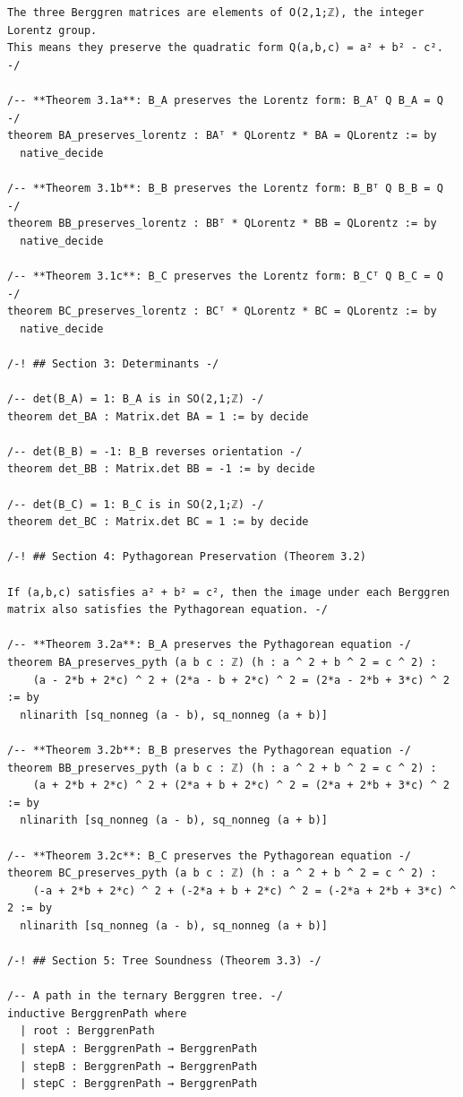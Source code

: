 \documentclass[11pt,openany]{book}
\theoremstyle{definition}
\theoremstyle{plain}
\theoremstyle{remark}
\begin{document}
\begin{lstlisting}[style=lean]
The three Berggren matrices are elements of O(2,1;ℤ), the integer Lorentz group.
This means they preserve the quadratic form Q(a,b,c) = a² + b² - c². -/

/-- **Theorem 3.1a**: B_A preserves the Lorentz form: B_Aᵀ Q B_A = Q -/
theorem BA_preserves_lorentz : BAᵀ * QLorentz * BA = QLorentz := by
  native_decide

/-- **Theorem 3.1b**: B_B preserves the Lorentz form: B_Bᵀ Q B_B = Q -/
theorem BB_preserves_lorentz : BBᵀ * QLorentz * BB = QLorentz := by
  native_decide

/-- **Theorem 3.1c**: B_C preserves the Lorentz form: B_Cᵀ Q B_C = Q -/
theorem BC_preserves_lorentz : BCᵀ * QLorentz * BC = QLorentz := by
  native_decide

/-! ## Section 3: Determinants -/

/-- det(B_A) = 1: B_A is in SO(2,1;ℤ) -/
theorem det_BA : Matrix.det BA = 1 := by decide

/-- det(B_B) = -1: B_B reverses orientation -/
theorem det_BB : Matrix.det BB = -1 := by decide

/-- det(B_C) = 1: B_C is in SO(2,1;ℤ) -/
theorem det_BC : Matrix.det BC = 1 := by decide

/-! ## Section 4: Pythagorean Preservation (Theorem 3.2)

If (a,b,c) satisfies a² + b² = c², then the image under each Berggren
matrix also satisfies the Pythagorean equation. -/

/-- **Theorem 3.2a**: B_A preserves the Pythagorean equation -/
theorem BA_preserves_pyth (a b c : ℤ) (h : a ^ 2 + b ^ 2 = c ^ 2) :
    (a - 2*b + 2*c) ^ 2 + (2*a - b + 2*c) ^ 2 = (2*a - 2*b + 3*c) ^ 2 := by
  nlinarith [sq_nonneg (a - b), sq_nonneg (a + b)]

/-- **Theorem 3.2b**: B_B preserves the Pythagorean equation -/
theorem BB_preserves_pyth (a b c : ℤ) (h : a ^ 2 + b ^ 2 = c ^ 2) :
    (a + 2*b + 2*c) ^ 2 + (2*a + b + 2*c) ^ 2 = (2*a + 2*b + 3*c) ^ 2 := by
  nlinarith [sq_nonneg (a - b), sq_nonneg (a + b)]

/-- **Theorem 3.2c**: B_C preserves the Pythagorean equation -/
theorem BC_preserves_pyth (a b c : ℤ) (h : a ^ 2 + b ^ 2 = c ^ 2) :
    (-a + 2*b + 2*c) ^ 2 + (-2*a + b + 2*c) ^ 2 = (-2*a + 2*b + 3*c) ^ 2 := by
  nlinarith [sq_nonneg (a - b), sq_nonneg (a + b)]

/-! ## Section 5: Tree Soundness (Theorem 3.3) -/

/-- A path in the ternary Berggren tree. -/
inductive BerggrenPath where
  | root : BerggrenPath
  | stepA : BerggrenPath → BerggrenPath
  | stepB : BerggrenPath → BerggrenPath
  | stepC : BerggrenPath → BerggrenPath


\end{lstlisting}
\end{document}
